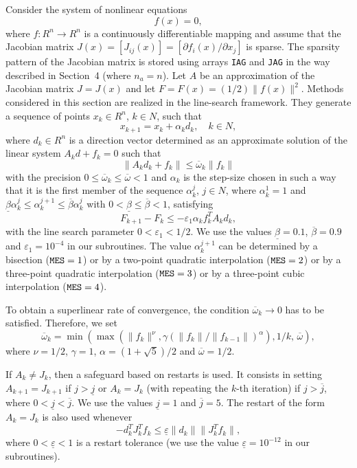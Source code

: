 \documentclass{esub2acm}
\newcommand{\be}{\begin{equation}}
\newcommand{\ee}{\end{equation}}
\begin{document}
\noindent Consider the system of nonlinear equations
%
\be
f(x)=0,
\label{60}
\ee
%
where $f: R^n \rightarrow R^n$ is a continuously differentiable mapping and assume
that the Jacobian matrix $J(x) = [J_{ij}(x)] = [\partial f_i(x) / \partial x_j]$
is sparse. The sparsity pattern of the Jacobian matrix is stored using arrays
{\tt IAG} and {\tt JAG} in the way described in Section~4 (where $n_a = n$).
Let $A$ be an approximation of the Jacobian matrix $J = J(x)$ and let
$F = F(x) = (1/2) \| f(x) \|^2$. Methods considered in this section are
realized in the line-search framework. They generate a sequence of points
$x_k \in R^n$, $k \in N$, such that
%
\be
x_{k+1} = x_k + \alpha_k d_k, \quad k \in N,
\label{61}
\ee
%
where $d_k \in R^n$ is a direction vector determined as an approximate
solution of the linear system $A_k d + f_k = 0$ such that
%
\be
\| A_k d_k + f_k \| \leq \overline{\omega}_k \| f_k \|
\label{62}
\ee
%
with the precision $0 \leq \overline{\omega}_k \leq \overline{\omega} < 1$
and $\alpha_k$ is the step-size chosen in such a way that it is the
first member of the sequence $\alpha_k^j$, $j \in N$, where $\alpha_k^1 = 1$
and $\underline{\beta} \alpha_k^j \leq \alpha_k^{j+1} \leq \overline{\beta}
\alpha_k^j$ with $0 < \underline{\beta} \leq \overline{\beta} < 1$,
satisfying
%
\be
\label{63}
F_{k+1} - F_k \leq - \varepsilon_1 \alpha_k f_k^T A_k d_k,
\ee
%
with the line search parameter $0 < \varepsilon_1 < 1/2$. We use the values
$\underline{\beta} = 0.1$, $\overline{\beta} = 0.9$ and $\varepsilon_1 = 10^{-4}$
in our subroutines. The value $\alpha_k^{j+1}$ can be determined
by a bisection (${\tt MES}=1$) or by a two-point quadratic interpolation
(${\tt MES}=2$) or by a three-point quadratic interpolation (${\tt MES}=3$)
or by a three-point cubic interpolation (${\tt MES}=4$).

To obtain a superlinear rate of convergence, the condition
$\overline{\omega}_k \rightarrow 0$ has to be satisfied. Therefore,
we set
%
$$\overline{\omega}_k = \min(\max(\| f_k \|^\nu,
\gamma (\| f_k \| / \| f_{k-1} \|)^\alpha), 1/k, \, \overline{\omega}),$$
%
where $\nu = 1/2$,  $\gamma = 1$, $\alpha = (1 + \sqrt 5) / 2$ and
$\overline{\omega} = 1/2$.

If $A_k \neq J_k$, then a safeguard based on restarts is used. It consists
in setting $A_{k+1} = J_{k+1}$ if $j > \underline{j}$ or $A_k = J_k$
(with repeating the $k$-th iteration) if
$j > \overline{j}$, where $0 < \underline{j} < \overline{j}$. We use the
values $\underline{j} = 1$ and $\overline{j} = 5$. The restart of the form
$A_k = J_k$ is also used whenever
%
$$- d_k^T J_k^T f_k \leq \underline{\varepsilon} \| d_k \| \| J_k^T f_k \|,$$
%
where $0 < \underline{\varepsilon} < 1$ is a restart tolerance
(we use the value $\underline{\varepsilon} = 10^{-12}$ in our subroutines).
\end{document}
